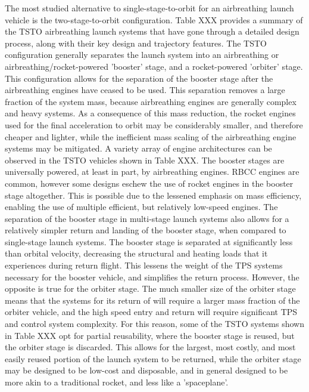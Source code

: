 The most studied alternative to single-stage-to-orbit for an airbreathing launch vehicle is the two-stage-to-orbit configuration. Table XXX provides a summary of the TSTO airbreathing launch systems that have gone through a detailed design process, along with their key design and trajectory features. The TSTO configuration generally separates the launch system into an airbreathing or airbreathing/rocket-powered 'booster' stage, and a rocket-powered 'orbiter' stage. This configuration allows for the separation of the booster stage after the airbreathing engines have ceased to be used. This separation removes a large fraction of the system mass, because airbreathing engines are generally complex and heavy systems. As a consequence of this mass reduction, the rocket engines used for the final acceleration to orbit may be considerably smaller, and therefore cheaper and lighter, while the inefficient mass scaling of the airbreathing engine systems may be mitigated. 
A variety array of engine architectures can be observed in the TSTO vehicles shown in Table XXX. The booster stages are universally powered, at least in part, by airbreathing engines. RBCC engines are common, however some designs eschew the use of rocket engines in the booster stage altogether. This is possible due to the lessened emphasis on mass efficiency, enabling the use of multiple efficient, but relatively low-speed engines.
The separation of the booster stage in multi-stage launch systems also allows for a relatively simpler return and landing of the booster stage, when compared to single-stage launch systems. The booster stage is separated at significantly less than orbital velocity, decreasing the structural and heating loads that it experiences during return flight. This lessens the weight of the TPS systems necessary for the booster vehicle, and simplifies the return process.
However, the opposite is true for the orbiter stage. The much smaller size of the orbiter stage means that the systems for its return of will require a larger mass fraction of the orbiter vehicle, and the high speed entry and return will require significant TPS and control system complexity. 
For this reason, some of the TSTO systems shown in Table XXX opt for partial reusability, where the booster stage is reused, but the orbiter stage is discarded. This allows for the largest, most costly, and most easily reused portion of the launch system to be returned, while the orbiter stage may be designed to be low-cost and disposable, and in general designed to be more akin to a traditional rocket, and less like a 'spaceplane'. 


